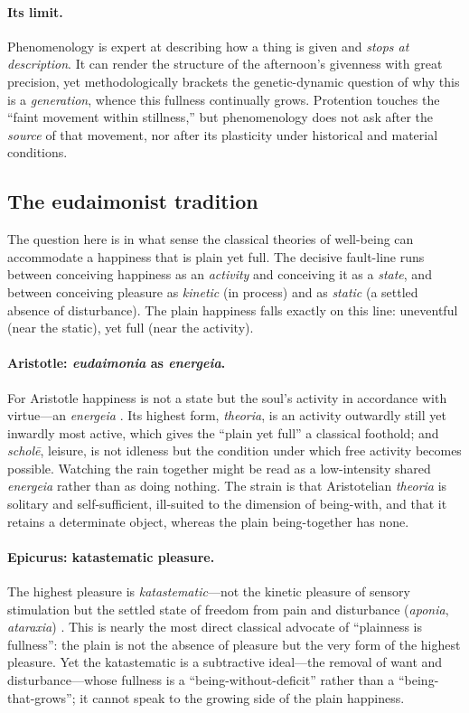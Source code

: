\paragraph{Its limit.} Phenomenology is expert at describing how a thing is given and \emph{stops at description}. It can render the structure of the afternoon's givenness with great precision, yet methodologically brackets the genetic-dynamic question of why this is a \emph{generation}, whence this fullness continually grows. Protention touches the ``faint movement within stillness,'' but phenomenology does not ask after the \emph{source} of that movement, nor after its plasticity under historical and material conditions.

\subsection{The eudaimonist tradition}
\label{p19:sub:theories-eudaimonia}

The question here is in what sense the classical theories of well-being can accommodate a happiness that is plain yet full. The decisive fault-line runs between conceiving happiness as an \emph{activity} and conceiving it as a \emph{state}, and between conceiving pleasure as \emph{kinetic} (in process) and as \emph{static} (a settled absence of disturbance). The plain happiness falls exactly on this line: uneventful (near the static), yet full (near the activity).

\paragraph{Aristotle: \emph{eudaimonia} as \emph{energeia}.} For Aristotle happiness is not a state but the soul's activity in accordance with virtue---an \emph{energeia} \parencite{aristotle2000}. Its highest form, \emph{theoria}, is an activity outwardly still yet inwardly most active, which gives the ``plain yet full'' a classical foothold; and \emph{scholē}, leisure, is not idleness but the condition under which free activity becomes possible. Watching the rain together might be read as a low-intensity shared \emph{energeia} rather than as doing nothing. The strain is that Aristotelian \emph{theoria} is solitary and self-sufficient, ill-suited to the dimension of being-with, and that it retains a determinate object, whereas the plain being-together has none.

\paragraph{Epicurus: katastematic pleasure.} The highest pleasure is \emph{katastematic}---not the kinetic pleasure of sensory stimulation but the settled state of freedom from pain and disturbance (\emph{aponia}, \emph{ataraxia}) \parencite{epicurus1994}. This is nearly the most direct classical advocate of ``plainness is fullness'': the plain is not the absence of pleasure but the very form of the highest pleasure. Yet the katastematic is a subtractive ideal---the removal of want and disturbance---whose fullness is a ``being-without-deficit'' rather than a ``being-that-grows''; it cannot speak to the growing side of the plain happiness.

